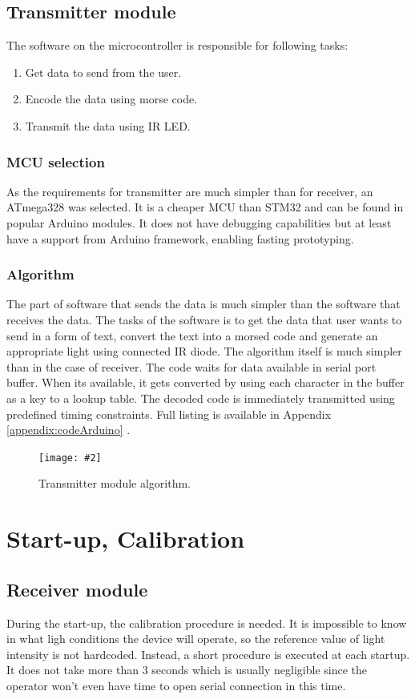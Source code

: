\documentclass[12pt]{article}
\newcommand{\appendixCodeRefArduino}
{
Appendix \ref{appendix:codeArduino}
}
\newcommand{\image}[3]{
\begin{figure}[h]
	\begin{center}
		\texttt{[image: \#2]}
	\end{center}
  \caption{#1}
\end{figure}}
\begin{document}
	\subsection{Transmitter module}
  The software on the microcontroller is responsible for following tasks:
  \begin{enumerate}
    \item Get data to send from the user.
    \item Encode the data using morse code.
    \item Transmit the data using IR LED.
  \end{enumerate}
  \subsubsection{MCU selection}
  As the requirements for transmitter are much simpler than for receiver, an ATmega328 was selected. It is a cheaper MCU than STM32 
  and can be found in popular Arduino modules. It does not have debugging capabilities but at least have a support from Arduino framework,
  enabling fasting prototyping.


  \subsubsection{Algorithm}
  The part of software that sends the data is much simpler than the software that receives the data.
  The tasks of the software is to get the data that user wants to send in a form of text, convert the text into a morsed code 
  and generate an appropriate light using connected IR diode. 
  The algorithm itself is much simpler than in the case of receiver. The code waits for data available in serial port buffer.
  When its available, it gets converted by using each character in the buffer as a key to a lookup table.
  The decoded code is immediately transmitted using predefined timing constraints.
  Full listing is available in \appendixCodeRefArduino.

  \image{Transmitter module algorithm.}{transmitter_algorithm.png}{0.4}

\newpage
	\section{Start-up, Calibration}
  \subsection{Receiver module}
  During the start-up, the calibration procedure is needed. It is impossible to know in what ligh conditions the device will operate, so the reference value of light intensity is not hardcoded.
  Instead, a short procedure is executed at each startup. It does not take more than 3 seconds which is usually negligible since the operator won't even have time to open serial connection in this time.
\end{document}
